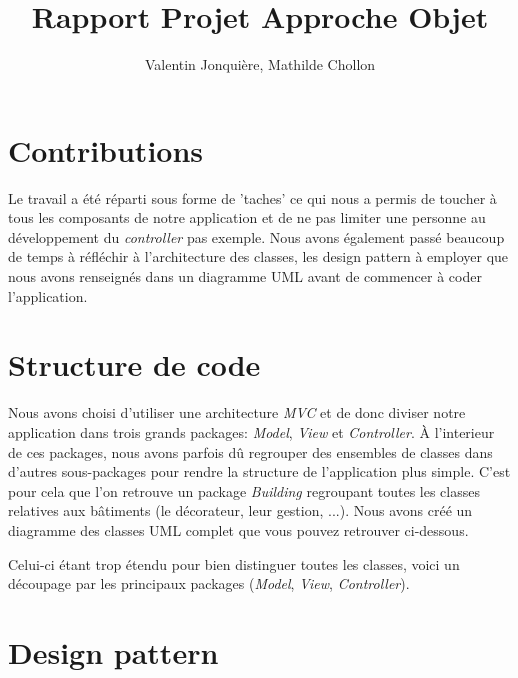 \documentclass{article}
\author{
    Valentin Jonquière,
    Mathilde Chollon
}
\title{Rapport Projet Approche Objet}
\begin{document}
\maketitle

\pagebreak

\tableofcontents

\pagebreak

\section{Contributions}
Le travail a été réparti sous forme de 'taches' ce qui nous a permis de toucher à tous les composants de notre application
et de ne pas limiter une personne au développement du \textit{controller} pas exemple. Nous avons également passé beaucoup
de temps à réfléchir à l'architecture des classes, les design pattern à employer que nous avons renseignés dans un diagramme
UML avant de commencer à coder l'application.

\section{Structure de code}
Nous avons choisi d'utiliser une architecture \textit{MVC} et de donc diviser notre application dans trois grands packages: \textit{Model}, \textit{View}
et \textit{Controller}. À l'interieur de ces packages, nous avons parfois dû regrouper des ensembles de classes dans d'autres sous-packages pour rendre
la structure de l'application plus simple. C'est pour cela que l'on retrouve un package \textit{Building} regroupant toutes les classes relatives
aux bâtiments (le décorateur, leur gestion, ...). Nous avons créé un diagramme des classes UML complet que vous pouvez retrouver ci-dessous.

Celui-ci étant trop étendu pour bien distinguer toutes les classes, voici un découpage par les principaux packages (\textit{Model}, \textit{View}, \textit{Controller}).

\section{Design pattern}
\end{document}
